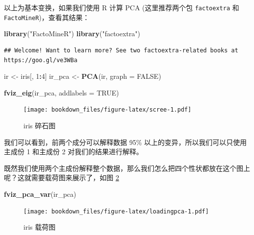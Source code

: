 \documentclass[
]{krantz}
\makeatletter
\newenvironment{Shaded}{\begin{snugshade}}{\end{snugshade}}
\newcommand{\DataTypeTok}[1]{\textcolor[rgb]{0.13,0.29,0.53}{#1}}
\newcommand{\DecValTok}[1]{\textcolor[rgb]{0.00,0.00,0.81}{#1}}
\newcommand{\KeywordTok}[1]{\textcolor[rgb]{0.13,0.29,0.53}{\textbf{#1}}}
\newcommand{\NormalTok}[1]{#1}
\newcommand{\OperatorTok}[1]{\textcolor[rgb]{0.81,0.36,0.00}{\textbf{#1}}}
\newcommand{\OtherTok}[1]{\textcolor[rgb]{0.56,0.35,0.01}{#1}}
\newcommand{\StringTok}[1]{\textcolor[rgb]{0.31,0.60,0.02}{#1}}
\newenvironment{kframe}{%
\medskip{}
\setlength{\fboxsep}{.8em}
 \def\at@end@of@kframe{}%
 \ifinner\ifhmode%
  \def\at@end@of@kframe{\end{minipage}}%
  \begin{minipage}{\columnwidth}%
 \fi\fi%
 \def\FrameCommand##1{\hskip\@totalleftmargin \hskip-\fboxsep
 \colorbox{shadecolor}{##1}\hskip-\fboxsep
     \hskip-\linewidth \hskip-\@totalleftmargin \hskip\columnwidth}%
 \MakeFramed {\advance\hsize-\width
   \@totalleftmargin\z@ \linewidth\hsize
   \@setminipage}}%
 {\par\unskip\endMakeFramed%
 \at@end@of@kframe}
\renewenvironment{Shaded}{\begin{kframe}}{\end{kframe}}
\makeatother
\begin{document}
以上为基本变换，如果我们使用 R 计算 PCA (这里推荐两个包 \texttt{factoextra} 和 \texttt{FactoMineR})，查看其结果：

\begin{Shaded}
\begin{Highlighting}[]
\KeywordTok{library}\NormalTok{(}\StringTok{"FactoMineR"}\NormalTok{)}
\KeywordTok{library}\NormalTok{(}\StringTok{"factoextra"}\NormalTok{)}
\end{Highlighting}
\end{Shaded}

\begin{verbatim}
## Welcome! Want to learn more? See two factoextra-related books at https://goo.gl/ve3WBa
\end{verbatim}

\begin{Shaded}
\begin{Highlighting}[]
\NormalTok{ir \textless{}{-}}\StringTok{ }\NormalTok{iris[, }\DecValTok{1}\OperatorTok{:}\DecValTok{4}\NormalTok{]}
\NormalTok{ir\_pca \textless{}{-}}\StringTok{ }\KeywordTok{PCA}\NormalTok{(ir, }\DataTypeTok{graph =} \OtherTok{FALSE}\NormalTok{)}

\KeywordTok{fviz\_eig}\NormalTok{(ir\_pca, }\DataTypeTok{addlabels =} \OtherTok{TRUE}\NormalTok{)}
\end{Highlighting}
\end{Shaded}

\begin{figure}
\centering
\texttt{[image: bookdown\_files/figure-latex/scree-1.pdf]}
\caption{\label{fig:scree}iris 碎石图}
\end{figure}

我们可以看到，前两个成分可以解释数据 95\% 以上的变异，所以我们可以只使用主成份 1 和主成份 2 对我们的结果进行解释。

既然我们使用两个主成份解释整个数据，那么我们怎么把四个性状都放在这个图上呢？这就需要载荷图来展示了，如图 \ref{fig:loadingpca}

\begin{Shaded}
\begin{Highlighting}[]
\KeywordTok{fviz\_pca\_var}\NormalTok{(ir\_pca)}
\end{Highlighting}
\end{Shaded}

\begin{figure}
\centering
\texttt{[image: bookdown\_files/figure-latex/loadingpca-1.pdf]}
\caption{\label{fig:loadingpca}iris 载荷图}
\end{figure}
\end{document}

